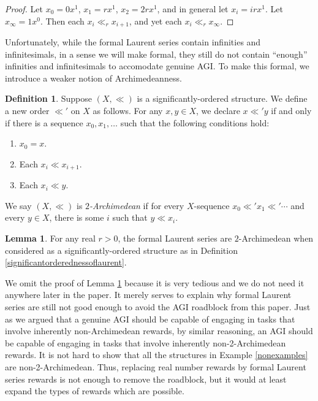 \documentclass[reqno]{article}
\theoremstyle{definition}
\newtheorem{lemma}[theorem]{Lemma}
\newtheorem{definition}{Definition}
\begin{document}
\begin{proof}
Let $x_0=0x^1$, $x_1=rx^1$, $x_2=2rx^1$, and in general let
$x_i=irx^1$. Let $x_\infty=1x^0$. Then each $x_i\ll_r x_{i+1}$,
and yet each $x_i\ll_r x_\infty$.
\end{proof}

Unfortunately, while the formal Laurent series contain infinities and infinitesimals,
in a sense we will make formal, they still do not contain ``enough'' infinities and
infinitesimals to accomodate genuine AGI. To make this formal, we introduce a weaker
notion of Archimedeanness.

\begin{definition}
Suppose $(X,\ll)$ is a significantly-ordered structure.
We define a new order $\ll'$ on $X$ as follows.
For any $x,y\in X$, we declare $x\ll' y$ if and only if there is a sequence
$x_0,x_1,\ldots$ such that the following conditions hold:
\begin{enumerate}
    \item
    $x_0=x$.
    \item
    Each $x_i\ll x_{i+1}$.
    \item
    Each $x_i\ll y$.
\end{enumerate}
We say $(X,\ll)$ is \emph{$2$-Archimedean} if for every $X$-sequence
$x_0\ll' x_1\ll' \cdots$ and every $y\in X$, there is some $i$ such that
$y\ll x_i$.
\end{definition}

\begin{lemma}
\label{tedioustheorem}
For any real $r>0$,
the formal Laurent series are $2$-Archimedean when considered as a
significantly-ordered structure as in Definition \ref{significantorderednessoflaurent}.
\end{lemma}

We omit the proof of Lemma \ref{tedioustheorem} because it is very tedious and
we do not need it anywhere later in the paper. It merely serves to explain
why formal Laurent series are still not good enough to avoid the AGI roadblock
from this paper.
Just as we argued that a genuine AGI should be capable of engaging in tasks that
involve inherently non-Archimedean rewards, by similar reasoning, an AGI should
be capable of engaging in tasks that involve inherently non-2-Archimedean rewards.
It is not hard to show that all the structures in Example \ref{nonexamples} are
non-2-Archimedean. Thus, replacing real number rewards by formal Laurent series
rewards is not enough to remove the roadblock, but it would at least expand the
types of rewards which are possible.
\end{document}
